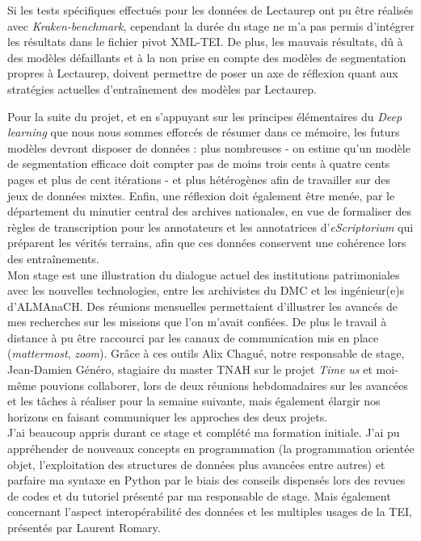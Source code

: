 Si les tests spécifiques effectués pour les données de Lectaurep ont pu être réalisés avec \textit{Kraken-benchmark}, cependant la durée du stage ne m'a pas permis d'intégrer les résultats dans le fichier pivot XML-TEI. De plus, les mauvais résultats, dû à des modèles défaillants et à la non prise en compte des modèles de segmentation propres à Lectaurep, doivent permettre de poser un axe de réflexion quant aux stratégies actuelles d'entraînement des modèles par Lectaurep.

\newpage
Pour la suite du projet, et en s'appuyant sur les principes élémentaires du \textit{Deep learning} que nous nous sommes efforcés de résumer dans ce mémoire, les futurs modèles devront disposer de données : plus nombreuses - on estime qu'un modèle de segmentation efficace doit compter pas de moins trois cents à quatre cents pages et plus de cent itérations - et plus hétérogènes afin de travailler sur des jeux de données mixtes. Enfin, une réflexion doit également être menée, par le département du minutier central des archives nationales, en vue de formaliser des règles de transcription pour les annotateurs et les annotatrices d'\textit{eScriptorium} qui préparent les vérités terrains, afin que ces données conservent une cohérence lors des entraînements.\\

Mon stage est une illustration du dialogue actuel des institutions patrimoniales avec les nouvelles technologies, entre les archivistes du DMC et les ingénieur(e)s d'ALMAnaCH. Des réunions mensuelles permettaient d'illustrer les avancés de mes recherches sur les missions que l'on m'avait confiées. De plus le travail à distance à pu être raccourci par les canaux de communication mis en place (\textit{mattermost}, \textit{zoom}). Grâce à ces outils Alix Chagué, notre responsable de stage, Jean-Damien Généro, stagiaire du master TNAH sur le projet \textit{Time us} et moi-même pouvions collaborer, lors de deux réunions hebdomadaires sur les avancées et les tâches à réaliser pour la semaine suivante, mais également élargir nos horizons en faisant communiquer les approches des deux projets.\\

J'ai beaucoup appris durant ce stage et complété ma formation initiale. J'ai pu appréhender de nouveaux concepts en programmation (la programmation orientée objet, l'exploitation des structures de données plus avancées entre autres) et parfaire ma syntaxe en Python par le biais des conseils dispensés lors des revues de codes et du tutoriel présenté par ma responsable de stage. Mais également concernant l'aspect interopérabilité des données et les multiples usages de la TEI, présentés par Laurent Romary.\\  

